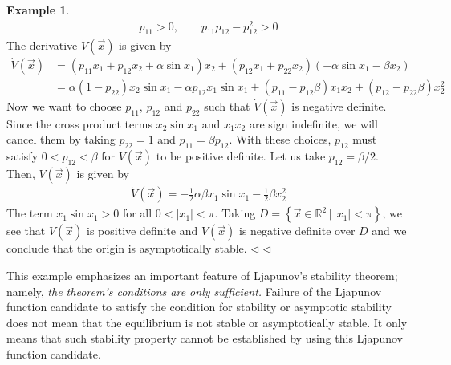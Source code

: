 \documentclass[11pt,a4paper,oneside]{book}
\numberwithin{equation}{section}
\theoremstyle{it}
\theoremstyle{definition}
\newtheorem{example}{Example}[chapter]
\begin{document}
\begin{example}
\begin{equation*}
\begin{aligned}
			p_{11} >0,\qquad p_{11}p_{12}-p_{12}^2>0
		\end{aligned}
	\end{equation*}
	The derivative $\dot{V}(\vec{x})$ is given by
	\begin{equation*}
		\begin{aligned}
			\dot{V}(\vec{x}) &= (p_{11}x_1+p_{12}x_2+\alpha\sin 
			x_1)x_2+(p_{12}x_1+p_{22}x_2)(-\alpha\sin x_1-\beta x_2) \\[6pt] &= 
			\alpha(1-p_{22})x_2\sin x_1-\alpha p_{12}x_1\sin 
			x_1+(p_{11}-p_{12}\beta)x_1x_2+(p_{12}-p_{22}\beta)x_2^2
		\end{aligned}
	\end{equation*}
	Now we want to choose $p_{11},\,p_{12}$ and $p_{22}$ such that 
	$\dot{V}(\vec{x})$ is negative definite. Since the cross product terms 
	$x_2\sin x_1$ and $x_1x_2$ are sign indefinite, we will cancel them by 
	taking $p_{22}=1$ and $p_{11}=\beta p_{12}$. With these choices, $p_{12}$ 
	must satisfy $0<p_{12}<\beta$ for $V(\vec{x})$ to be positive definite. Let 
	us take $p_{12}=\beta/2$. Then, $\dot{V}(\vec{x})$ is given by
	\begin{equation*}
		\begin{aligned}
			\dot{V}(\vec{x})=-\frac{1}{2}\alpha\beta x_1\sin x_1-\frac{1}{2} 
			\beta x_2^2
		\end{aligned}
	\end{equation*}
	The term $x_1\sin x_1>0$ for all $0<|x_1|<\pi$. Taking $D=\left\lbrace 
	\vec{x}\in\mathbb{R}^2\,|\,|x_1|<\pi\right\rbrace $, we see that 
	$V(\vec{x})$ is positive definite and $\dot{V}(\vec{x})$ is negative 
	definite over $D$ and we conclude that the origin is asymptotically stable. 
	$\triangleleft$
$\triangleleft$ \end{example}
This example emphasizes an important feature of Ljapunov's stability theorem; 
namely, \textit{the theorem's conditions are only sufficient.} Failure of the 
Ljapunov function candidate to satisfy the condition for stability or 
asymptotic stability does not mean that the equilibrium is not stable or 
asymptotically stable. It only means that such stability property cannot be 
established by using this Ljapunov function candidate. 
\end{document}
